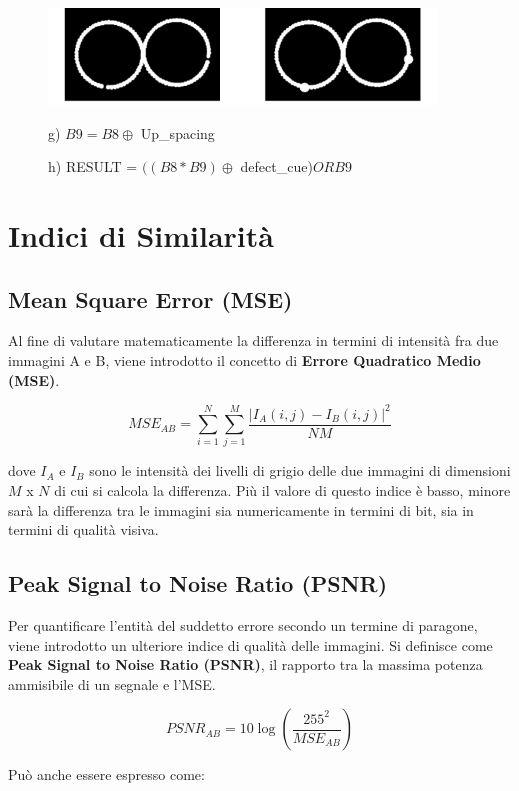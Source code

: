 \begin{figure}[H]
    \centering
    \includegraphics[width=\linewidth, keepaspectratio]{capitoli/immagini/imgs/orologi5.png}
    \caption*{g) $B9=B8 \oplus$ Up\_spacing}
    \caption*{h) RESULT = $((B8 * B9) \oplus$ defect\_cue)$OR B9$ }
\end{figure}

\chapter{Indici di Similarità}

\section{Mean Square Error (MSE)}

Al fine di valutare matematicamente la differenza in termini di intensità fra due immagini A e B, viene introdotto il concetto di
\textbf{Errore Quadratico Medio (MSE)}.

$$
    MSE_{AB} = \sum_{i=1}^{N}\sum_{j=1}^{M}\frac{|I_A(i,j)-I_B(i,j)|^2}{NM}
$$

dove $I_A$ e $I_B$ sono le intensità dei livelli di grigio delle due immagini di dimensioni $M$ x $N$ di cui si calcola la differenza. Più il valore di questo indice è basso, minore sarà la differenza tra
le immagini sia numericamente in termini di bit, sia in termini di qualità visiva.

\section{Peak Signal to Noise Ratio (PSNR)}

Per quantificare l'entità del suddetto errore secondo un termine di paragone, viene introdotto un ulteriore indice di qualità delle
immagini. Si definisce come \textbf{Peak Signal to Noise Ratio (PSNR)}, il rapporto
tra la massima potenza ammisibile di un segnale e l'MSE.

$$
    PSNR_{AB} = 10 \log(\frac{255^2}{MSE_{AB}})
$$

Può anche essere espresso come:

